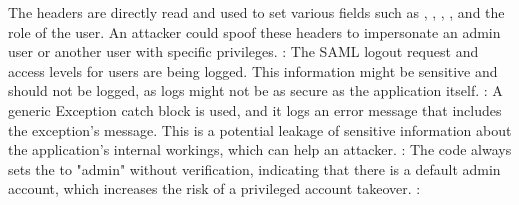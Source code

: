\markdownRendererOlEndTight \markdownRendererInterblockSeparator
{}\markdownRendererUlBeginTight
\markdownRendererUlItem The  headers are directly read and used to set various fields such as , , , , and the role of the user. An attacker could spoof these headers to impersonate an admin user or another user with specific privileges.\markdownRendererUlItemEnd 
\markdownRendererUlEndTight \markdownRendererInterblockSeparator
{}\markdownRendererOlBeginTight
{}:\markdownRendererOlItemEnd 
\markdownRendererOlEndTight \markdownRendererInterblockSeparator
{}\markdownRendererUlBeginTight
\markdownRendererUlItem The SAML logout request and access levels for users are being logged. This information might be sensitive and should not be logged, as logs might not be as secure as the application itself.\markdownRendererUlItemEnd 
\markdownRendererUlEndTight \markdownRendererInterblockSeparator
{}\markdownRendererOlBeginTight
{}:\markdownRendererOlItemEnd 
\markdownRendererOlEndTight \markdownRendererInterblockSeparator
{}\markdownRendererUlBeginTight
\markdownRendererUlItem A generic Exception catch block is used, and it logs an error message that includes the exception's message. This is a potential leakage of sensitive information about the application's internal workings, which can help an attacker.\markdownRendererUlItemEnd 
\markdownRendererUlEndTight \markdownRendererInterblockSeparator
{}\markdownRendererOlBeginTight
{}:\markdownRendererOlItemEnd 
\markdownRendererOlEndTight \markdownRendererInterblockSeparator
{}\markdownRendererUlBeginTight
\markdownRendererUlItem The code always sets the  to "admin" without verification, indicating that there is a default admin account, which increases the risk of a privileged account takeover.\markdownRendererUlItemEnd 
\markdownRendererUlEndTight \markdownRendererInterblockSeparator
{}\markdownRendererOlBeginTight
{}:\markdownRendererOlItemEnd 
\markdownRendererOlEndTight \markdownRendererInterblockSeparator
